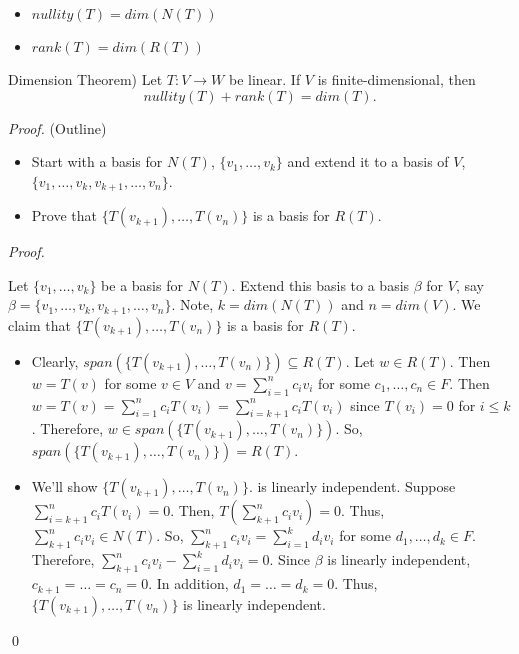 \documentclass[12pt]{article}
\newenvironment{theorem}[2][Theorem]{\begin{trivlist}
\item[\hskip \labelsep {\bfseries #1}\hskip \labelsep {\bfseries #2.}]}{\end{trivlist}}
\newenvironment{sol}
    {\emph{Proof.}
    }
    {
    \qed
    }
\begin{document}
\begin{itemize}
    \item $nullity(T) = dim(N(T))$
    \item $rank(T) = dim(R(T))$
\end{itemize}

\begin{theorem}{2.3}
(Dimension Theorem) Let $T : V \to W$ be linear. If $V$ is finite-dimensional, then $$nullity(T) + rank(T) = dim(T).$$
\end{theorem}

\textit{Proof.} (Outline)
\begin{itemize}
    \item Start with a basis for $N(T)$, $\{v_1, \dots, v_k\}$ and extend it to a basis of $V$, \newline
    $\{v_1, \dots, v_k, v_{k+1}, \dots, v_n\}$.
    \item Prove that $\{T(v_{k+1}), \dots, T(v_n)\}$ is a basis for $R(T)$.
\end{itemize}

\begin{sol}
Let $\{v_1, \dots, v_k\}$ be a basis for $N(T)$. Extend this basis to a basis $\beta$ for $V$, say $\beta = \{v_1, \dots, v_k, v_{k+1}, \dots, v_n\}$. Note, $k = dim(N(T))$ and $n = dim(V)$. We claim that $\{T(v_{k + 1}), \dots, T(v_n)\}$ is a basis for $R(T)$.
\begin{itemize}
    \item[(1)] Clearly, $span(\{T(v_{k + 1}), \dots, T(v_n)\}) \subseteq R(T)$. Let $w \in R(T)$. Then $w = T(v)$ for some $v \in V$ and $v = \sum_{i = 1}^nc_iv_i$ for some $c_1, \dots, c_n \in F$. Then $w = T(v) = \sum_{i = 1}^n c_iT(v_i) = \sum_{i = k+1}^nc_iT(v_i)$ since $T(v_i) = 0$ for $i \leq k$. Therefore, $w \in span(\{T(v_{k + 1}), \dots, T(v_n)\})$. So, $span(\{T(v_{k + 1}), \dots, T(v_n)\}) = R(T)$.
    
    \item[(2)] We'll show $\{T(v_{k + 1}), \dots, T(v_n)\}$. is linearly independent. Suppose $\sum_{i = k+1}^nc_iT(v_i) = 0$. Then, $T\left( \sum_{k + 1}^n c_iv_i \right) = 0$. Thus, $\sum_{k + 1}^n c_iv_i \in N(T)$. So, $\sum_{k + 1}^n c_iv_i = \sum_{i = 1}^kd_iv_i$ for some $d_1, \dots, d_k \in F$. Therefore, $\sum_{k + 1}^n c_iv_i - \sum_{i = 1}^kd_iv_i = 0$. Since $\beta$ is linearly independent, $c_{k + 1} = \dots = c_n = 0$. In addition, $d_1 = \dots = d_k = 0$. Thus, $\{T(v_{k + 1}), \dots, T(v_n)\}$ is linearly independent.
\end{itemize}
\end{sol}
\end{document}

